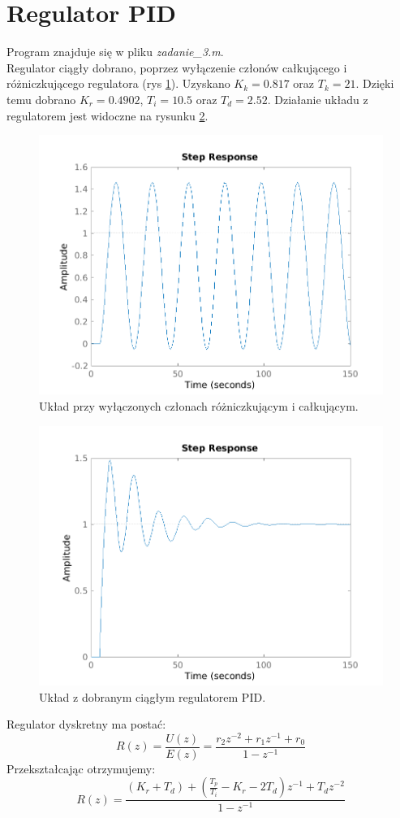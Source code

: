 \documentclass[a4paper, 10pt]{article}
\begin{document}
	\section{Regulator PID}
	Program znajduje się w pliku \textit{zadanie\_3.m}.\\
	Regulator ciągły dobrano, poprzez wyłączenie członów całkującego i różniczkującego regulatora (rys \ref{fig:z3kkciagly}). Uzyskano $K_k=0.817$ oraz $T_k = 21$. Dzięki temu dobrano $K_r=0.4902$, $T_i = 10.5$ oraz $T_d = 2.52$. Działanie układu z regulatorem jest widoczne na rysunku \ref{fig:z3pidciagly}.
	\begin{figure}
		\centering
		\includegraphics[width=0.7\linewidth]{z3_kk_ciagly}
		\caption{Układ przy wyłączonych członach różniczkującym i całkującym.}
		\label{fig:z3kkciagly}
	\end{figure}
	\begin{figure}
		\centering
		\includegraphics[width=0.7\linewidth]{z3_pid_ciagly}
		\caption{Układ z dobranym ciągłym regulatorem PID.}
		\label{fig:z3pidciagly}
	\end{figure}
	
	Regulator dyskretny ma postać:
	\[R(z)=\frac{U(z)}{E(z)}=\frac{r_2z^{-2} + r_1z^{-1} + r_0}{1 - z^{-1}}\]
	Przekształcając otrzymujemy:
	\[R(z) = \frac{(K_r + T_d) + (\frac{T_p}{T_i}-K_r-2T_d)z^{-1}+T_dz^{-2}}{1-z^{-1}}\]
	
\end{document}
